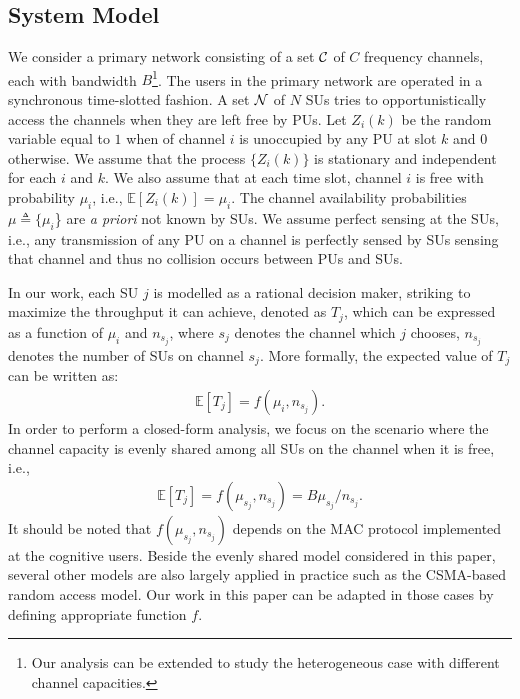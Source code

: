 \documentclass[12pt, onecolumn]{IEEEtran}
\theoremstyle{plain}
\theoremstyle{definition}
\begin{document}
\subsection{System Model}
We consider a primary network consisting of a set $\cal C$ of $C$ frequency channels, each with bandwidth $B$\footnote{Our analysis can be extended to study the heterogeneous case with different channel capacities.}. The users in the primary network are
operated in a synchronous time-slotted fashion. A set ${\cal N}$ of $N$ SUs tries to opportunistically access the channels when they are left free by PUs. Let $Z_i(k)$ be the random variable equal to $1$ when of channel $i$ is unoccupied by any PU at slot $k$ and $0$ otherwise. We assume that the process $\{Z_i(k)\}$ is stationary and independent for each $i$ and $k$. We also assume
that at each time slot, channel $i$ is free with probability $\mu_i$, i.e., $\mathbb{E}[Z_i(k)]=\mu_i$. The channel availability probabilities $\mu \triangleq \{\mu_i$\} are {\it a priori} not known by SUs. We assume perfect sensing at the SUs, i.e., any transmission of any PU on a channel is perfectly sensed by SUs sensing that channel and thus no collision occurs between PUs and SUs.

In our work, each SU $j$ is modelled as a rational decision maker, striking to maximize the throughput it can achieve, denoted as $T_j$, which can be expressed as a function of $\mu_i$ and $n_{s_j}$, where $s_j$ denotes the channel which $j$ chooses, $n_{s_j}$ denotes the number of SUs on channel $s_j$. More formally, the expected value of $T_j$ can be written as:
\begin{eqnarray*}
\mathbb{E}[T_j]=f(\mu_i, n_{s_j}).
\end{eqnarray*}
In order to perform a closed-form analysis, we focus on the scenario where the channel capacity is evenly shared among all SUs on the channel when it is free, i.e.,
\begin{eqnarray*}
\mathbb{E}[T_j]=f(\mu_{s_j}, n_{s_j})=B\mu_{s_j}/n_{s_j}.
\end{eqnarray*}
It should be noted that $f(\mu_{s_j}, n_{s_j})$ depends on the MAC protocol implemented at the cognitive users. Beside the evenly shared model considered in this paper, several other models are also largely applied in practice such as the CSMA-based random access model. Our work in this paper can be adapted in those cases by defining appropriate function $f$.
\end{document}
